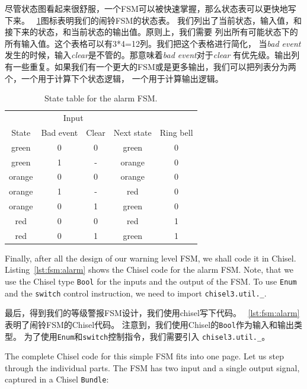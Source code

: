 \documentclass[%
    10pt,
    headinclude, footexclude,
    openright, %
    notitlepage,
    cleardoubleempty,
    headsepline,
    pointlessnumbers,
    bibtotoc, idxtotoc,
    ]{scrbook}
\newcommand{\code}[1]{{\small{\texttt{#1}}}}
\begin{document}
尽管状态图看起来很舒服，一个FSM可以被快速掌握，那么状态表可以更快地写下来。
~\ref{tab:state:table}图标表明我们的闹铃FSM的状态表。
我们列出了当前状态，输入值，和接下来的状态，和当前状态的输出值。原则上，我们需要
列出所有可能状态下的所有输入值。这个表格可以有3*4=12列。我们把这个表格进行简化，
当\emph{bad event}发生的时候，输入\emph{clear}是不管的。那意味着\emph{bad event}对于\emph{clear}
有优先级。输出列有一些重复。如果我们有一个更大的FSM或是更多输出，我们可以把列表分为两个，一个用于计算下个状态逻辑，
一个用于计算输出逻辑。


\begin{table}
\centering
\caption{State table for the alarm FSM.}
\begin{tabular}{ccccc}
\toprule
& \multicolumn{2}{c}{Input} \\
\cmidrule{2-3}
State &  Bad event & Clear & Next state & Ring bell \\
\midrule
green & 0 & 0 & green & 0 \\
green & 1 & - & orange & 0 \\
orange & 0 & 0 & orange & 0 \\
orange & 1 & - & red & 0 \\
orange & 0 & 1 & green & 0 \\
red & 0 & 0 & red & 1 \\
red & 0 & 1 & green & 1 \\
\bottomrule
\end{tabular}
\label{tab:state:table}
\end{table}

Finally, after all the design of our warning level FSM, we shall code it in Chisel.
Listing~\ref{lst:fsm:alarm} shows the Chisel code for the alarm FSM.
Note, that we use the Chisel type \code{Bool} for the inputs and the
output of the FSM.
To use \code{Enum} and the \code{switch} control instruction, we need to
import \code{chisel3.util.\_}.

最后，得到我们的等级警报FSM设计，我们使用chisel写下代码。
~\ref{lst:fsm:alarm}表明了闹铃FSM的Chisel代码。
注意到，我们使用Chisel的\code{Bool}作为输入和输出类型。
为了使用\code{Enum}和\code{switch}控制指令，我们需要引入
\code{chisel3.util.\_}。


The complete Chisel code for this simple FSM fits into one page.
Let us step through the individual parts.
The FSM has two input and a single output signal, captured in a Chisel \code{Bundle}:
%
\end{document}
